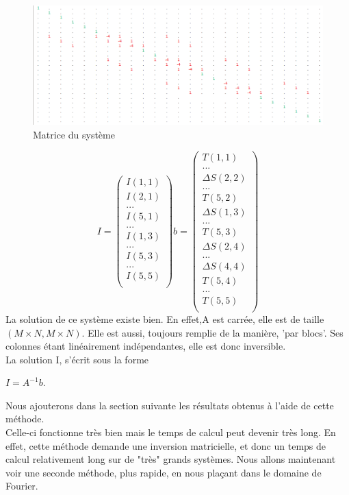 \begin{figure}[!htb]
\includegraphics[scale=0.5]{Images/matrice.png}
\caption{Matrice du système}
\end{figure}
\begin{equation}
I = 
\begin{pmatrix}
I(1,1)\\
I(2,1)\\
...\\
I(5,1)\\
...\\
I(1,3)\\
...\\
I(5,3)\\
...\\
I(5,5)\\
\end{pmatrix}
b = 
\begin{pmatrix}
T(1,1)\\
...\\
\Delta S(2,2)\\
...\\
T(5,2)\\
\Delta S(1,3)\\
...\\
T(5,3)\\
\Delta S(2,4)\\
...\\
\Delta S(4,4)\\
T(5,4)\\
...\\
T(5,5)\\
\end{pmatrix}
\end{equation}
La solution de ce système existe bien. En effet,A est carrée, elle est de taille $\left(M\times N, M \times N\right)$. Elle est aussi, toujours remplie de la manière, 'par blocs'. Ses colonnes étant linéairement indépendantes, elle est donc inversible.\\
La solution I, s'écrit sous la forme
\begin{center}
$I = A^{-1}b$.
\end{center} 
Nous ajouterons dans la section suivante les résultats obtenus à l'aide de cette méthode. \\ Celle-ci fonctionne très bien mais le temps de calcul peut devenir très long. En effet, cette méthode demande une inversion matricielle, et donc un temps de calcul relativement long sur de "très" grands systèmes. Nous allons maintenant voir une seconde méthode, plus rapide, en nous plaçant dans le domaine de Fourier.

